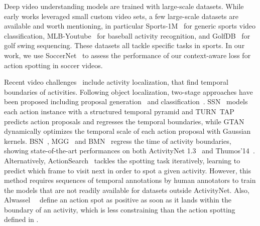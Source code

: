 \documentclass[10pt,twocolumn,letterpaper]{article}
\begin{document}
Deep video understanding models are trained with large-scale datasets. While early works leveraged small custom video sets, a few large-scale datasets are available and worth mentioning, in particular Sports-1M~\cite{KarpathyCVPR14} for generic sports video classification, MLB-Youtube~\cite{Piergiovanni_2018_CVPR_Workshops} for baseball activity recognition, and GolfDB~\cite{McNally_2019_CVPR_Workshops} for golf swing sequencing. These datasets all tackle specific tasks in sports. In our work, we use SoccerNet~\cite{Giancola_2018_CVPR_Workshops} to assess the performance of our context-aware loss for action spotting in soccer videos.



Recent video challenges~\cite{caba2015activitynet} include activity localization, that find temporal boundaries of activities.
Following object localization, two-stage approaches have been proposed including proposal generation~\cite{buch2017sst} and classification~\cite{sstad_buch_bmvc17}. SSN~\cite{zhao2017temporal} models each action instance with a structured temporal pyramid and TURN~TAP~\cite{gao2017turn} predicts action proposals and regresses the temporal boundaries, while GTAN~\cite{Long_2019_CVPR} dynamically optimizes the temporal scale of each action proposal with Gaussian kernels. BSN~\cite{Lin_2018_ECCV}, MGG~\cite{liu2019multi} and BMN~\cite{Lin_2019_ICCV} regress the time of activity boundaries, showing state-of-the-art performances on both ActivityNet 1.3~\cite{caba2015activitynet} and Thumos'14~\cite{THUMOS14}. Alternatively, ActionSearch~\cite{alwassel_2018_actionsearch} tackles the spotting task iteratively, learning to predict which frame to visit next in order to spot a given activity. However, this method requires sequences of temporal annotations by human annotators to train the models that are not readily available for datasets outside ActivityNet. Also, Alwassel~\etal~\cite{alwassel2018diagnosing} define an action spot as positive as soon as it lands within the boundary of an activity, which is less constraining than the action spotting defined in \SoccerNet.
\end{document}
